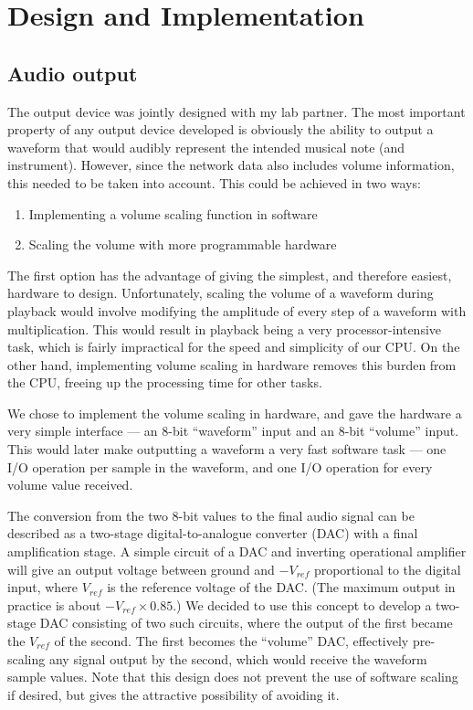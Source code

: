 \section{Design and Implementation}

\subsection{Audio output}
\label{sec:design:audio_output}

The output device was jointly designed with my lab partner.  The most important property of any 
output device developed is obviously the ability to output a waveform that would audibly represent 
the intended musical note (and instrument).  However, since the network data also includes volume 
information, this needed to be taken into account.  This could be achieved in two ways:
\begin{enumerate}
\item Implementing a volume scaling function in software
\item Scaling the volume with more programmable hardware
\end{enumerate}
The first option has the advantage of giving the simplest, and therefore easiest, hardware to 
design.  Unfortunately, scaling the volume of a waveform during playback would involve modifying the 
amplitude of every step of a waveform with multiplication.  This would result in playback being a 
very processor-intensive task, which is fairly impractical for the speed and simplicity of our CPU.  
On the other hand, implementing volume scaling in hardware removes this burden from the CPU, freeing 
up the processing time for other tasks.

We chose to implement the volume scaling in hardware, and gave the hardware a very simple interface 
--- an 8-bit ``waveform'' input and an 8-bit ``volume'' input.  This would later make outputting a 
waveform a very fast software task --- one I/O operation per sample in the waveform, and one I/O 
operation for every volume value received.

The conversion from the two 8-bit values to the final audio signal can be described as a two-stage 
digital-to-analogue converter (DAC) with a final amplification stage.  A simple circuit of a DAC and 
inverting operational amplifier will give an output voltage between ground and $-V_{ref}$ 
proportional to the digital input, where $V_{ref}$ is the reference voltage of the DAC.  (The 
maximum output in practice is about $-V_{ref}\times0.85$.)  We decided to use this concept to 
develop a two-stage DAC consisting of two such circuits, where the output of the first became the 
$V_{ref}$ of the second.  The first becomes the ``volume'' DAC, effectively pre-scaling any signal 
output by the second, which would receive the waveform sample values.  Note that this design does 
not prevent the use of software scaling if desired, but gives the attractive possibility of avoiding 
it.

